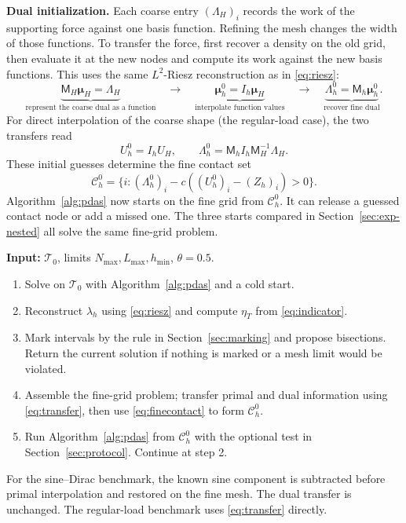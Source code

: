 \documentclass[11pt,a4paper]{article}
\begin{document}
\textbf{Dual initialization.} Each coarse entry $(\Lambda_H)_i$ records the work of the supporting force against one basis function. Refining the mesh changes the width of those functions. To transfer the force, first recover a density on the old grid, then evaluate it at the new nodes and compute its work against the new basis functions. This uses the same $L^2$-Riesz reconstruction as in \eqref{eq:riesz}:
\[
 \underbrace{\mathsf M_H\boldsymbol\mu_H=\Lambda_H}_{\text{represent the coarse dual as a function}}
 \quad\longrightarrow\quad
 \underbrace{\boldsymbol\mu_h^0=I_h\boldsymbol\mu_H}_{\text{interpolate function values}}
 \quad\longrightarrow\quad
 \underbrace{\Lambda_h^0=\mathsf M_h\boldsymbol\mu_h^0}_{\text{recover fine dual}}.
\]
For direct interpolation of the coarse shape (the regular-load case), the two transfers read
\begin{equation}\label{eq:transfer}
 \boxed{U_h^0=I_hU_H,\qquad\Lambda_h^0=\mathsf M_h I_h\mathsf M_H^{-1}\Lambda_H.}
\end{equation}
These initial guesses determine the fine contact set
\begin{equation}\label{eq:finecontact}
 \mathcal C_h^0=\{i:(\Lambda_h^0)_i-c((U_h^0)_i-(Z_h)_i)>0\}.
\end{equation}
Algorithm~\ref{alg:pdas} now starts on the fine grid from $\mathcal C_h^0$. It can release a guessed contact node or add a missed one. The three starts compared in Section~\ref{sec:exp-nested} all solve the same fine-grid problem.

\begin{algorithm}[H]
\caption{Adaptive FEM with $L^2$-nested PDAS initialization}\label{alg:nested}
\textbf{Input:} $\mathcal T_0$, limits $N_{\max},L_{\max},h_{\min}$, $\theta=0.5$.
\begin{enumerate}
\item Solve on $\mathcal T_0$ with Algorithm~\ref{alg:pdas} and a cold start.
\item Reconstruct $\lambda_h$ using \eqref{eq:riesz} and compute $\eta_T$ from \eqref{eq:indicator}.
\item Mark intervals by the rule in Section~\ref{sec:marking} and propose bisections. Return the current
solution if nothing is marked or a mesh limit would be violated.
\item Assemble the fine-grid problem; transfer primal and dual information
using \eqref{eq:transfer}, then use \eqref{eq:finecontact} to form $\mathcal C_h^0$.
\item Run Algorithm~\ref{alg:pdas} from $\mathcal C_h^0$ with the optional test in Section~\ref{sec:protocol}. Continue at step 2.
\end{enumerate}
\end{algorithm}
For the sine--Dirac benchmark, the known sine component is subtracted
before primal interpolation and restored on the fine mesh. The dual
transfer is unchanged. The regular-load benchmark uses
\eqref{eq:transfer} directly.
\end{document}
